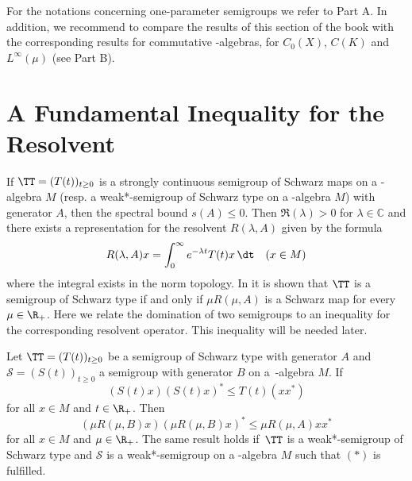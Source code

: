 For the notations concerning one-parameter semigroups we refer to Part A.
In addition, we recommend to compare the results of this section of the book with the corresponding results for commutative \CA-algebras, \ie for $ C_{0}(X) $, $ C(K) $ and $ L^\infty(\mu) $ (see Part B).
\section{A Fundamental Inequality for the Resolvent}\label{sec:d1-2}
If $ \TT = (T(t))_{t \geq 0} $ is a strongly continuous semigroup of Schwarz maps on a \CA-algebra $ M $ (resp. a weak*-semigroup of Schwarz type on a \WA-algebra $ M $) with generator $ A $, then the spectral bound $ s(A) \leq 0 $.
Then $ \Re(\lambda) > 0 $ for $ \lambda \in \mathbb{C} $ and there exists a representation for the resolvent $ R(\lambda,A) $ given by the formula
\[
 	R(\lambda,A)x = \int_{0}^\infty e^{-\lambda t} T(t)x \, \dt  \quad (x \in M)
\]
where the integral exists in the norm topology.
\newpage
In \citet{brattelirobinson:1979} it is shown that $ \TT $ is a semigroup of Schwarz type if and only if $ \mu R(\mu,A) $ is a Schwarz map for every $ \mu \in \R_{+} $.
Here we relate the domination of two semigroups to an inequality for the corresponding resolvent operator.
This inequality will be needed later.
\begin{theorem}\label{thm:d1-2.1}
Let $  \TT  = (T(t))_{t\geq0} $ be a semigroup of Schwarz type with generator $ A $ and $ \mathcal{S} = (S(t))_{t\geq0} $ a semigroup with generator $ B $ on a\, \CA-algebra $ M $.
If
\begin{equation}
	(S(t)x)(S(t)x)^{*} \leq T(t)(xx^{*}) \tag{*}
\end{equation}
for all $ x \in M $ and $ t \in \R_{+} $. 
Then 
\[
	(\mu R(\mu,B)x)(\mu R(\mu,B)x)^{*} \leq \mu R(\mu,A)xx^{*}
\]
for all $ x \in M $ and $ \mu \in \R_{+} $.
The same result holds if $ \,\TT $ is a weak*-semigroup of Schwarz type and $ \mathcal{S} $ is a weak*-semigroup on a \WA-algebra $ M $ such that $ (*) $ is fulfilled.
\end{theorem}


